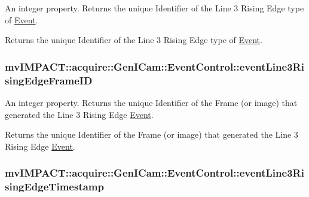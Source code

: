 An integer property. Returns the unique Identifier of the Line 3 Rising Edge type of \hyperlink{classmv_i_m_p_a_c_t_1_1acquire_1_1_event}{Event}. 

Returns the unique Identifier of the Line 3 Rising Edge type of \hyperlink{classmv_i_m_p_a_c_t_1_1acquire_1_1_event}{Event}. \hypertarget{classmv_i_m_p_a_c_t_1_1acquire_1_1_gen_i_cam_1_1_event_control_ace4dce3f25b85860b0c7b124bcbdd3ba}{
\subsubsection[{event\+Line3\+Rising\+Edge\+Frame\+I\+D}]{ mv\+I\+M\+P\+A\+C\+T\+::acquire\+::\+Gen\+I\+Cam\+::\+Event\+Control\+::event\+Line3\+Rising\+Edge\+Frame\+I\+D}}\label{classmv_i_m_p_a_c_t_1_1acquire_1_1_gen_i_cam_1_1_event_control_ace4dce3f25b85860b0c7b124bcbdd3ba}


An integer property. Returns the unique Identifier of the Frame (or image) that generated the Line 3 Rising Edge \hyperlink{classmv_i_m_p_a_c_t_1_1acquire_1_1_event}{Event}. 

Returns the unique Identifier of the Frame (or image) that generated the Line 3 Rising Edge \hyperlink{classmv_i_m_p_a_c_t_1_1acquire_1_1_event}{Event}. \hypertarget{classmv_i_m_p_a_c_t_1_1acquire_1_1_gen_i_cam_1_1_event_control_a281845677fae4f46e5f05e7b3e236c4b}{
\subsubsection[{event\+Line3\+Rising\+Edge\+Timestamp}]{ mv\+I\+M\+P\+A\+C\+T\+::acquire\+::\+Gen\+I\+Cam\+::\+Event\+Control\+::event\+Line3\+Rising\+Edge\+Timestamp}}\label{classmv_i_m_p_a_c_t_1_1acquire_1_1_gen_i_cam_1_1_event_control_a281845677fae4f46e5f05e7b3e236c4b}


